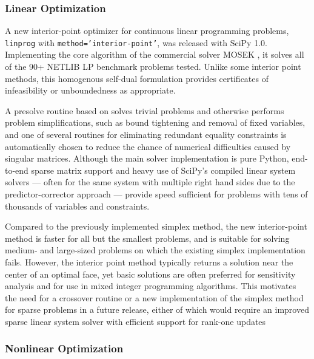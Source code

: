 \subsubsection*{Linear Optimization}

A new interior-point optimizer for continuous linear programming problems, \texttt{linprog} with \texttt{method='interior-point'}, was released with SciPy 1.0. Implementing the core algorithm of the commercial solver MOSEK \cite{andersen2000mosek}, it solves all of the 90+ NETLIB LP benchmark problems \cite{netlib} tested. Unlike some interior point methods, this homogenous self-dual formulation provides certificates of infeasibility or unboundedness as appropriate. 

A presolve routine based on \cite{andersen1995presolving} solves trivial problems and otherwise performs problem simplifications, such as bound tightening and removal of fixed variables, and one of several routines for eliminating redundant equality constraints is automatically chosen to reduce the chance of numerical difficulties caused by singular matrices. Although the main solver implementation is pure Python, end-to-end sparse matrix support and heavy use of SciPy's compiled linear system solvers --- often for the same system with multiple right hand sides due to the predictor-corrector approach --- provide speed sufficient for problems with tens of thousands of variables and constraints.

Compared to the previously implemented simplex method, the new interior-point method is faster for all but the smallest problems, and is suitable for solving medium- and large-sized problems on which the existing simplex implementation fails. However, the interior point method typically returns a solution near the center of an optimal face, yet basic solutions are often preferred for sensitivity analysis and for use in mixed integer programming algorithms. This motivates the need for a crossover routine or a new implementation of the simplex method for sparse problems in a future release, either of which would require an improved sparse linear system solver with efficient support for rank-one updates

\subsubsection*{Nonlinear Optimization}


